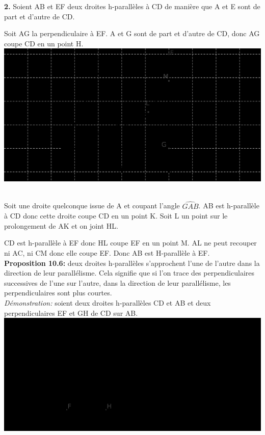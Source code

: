 \documentclass[a4paper, 12pt, twoside]{book}
\begin{document}
   \textbf{2.} Soient AB et EF deux droites h-parallèles à CD de manière que A et E sont de part et d'autre de CD.\
  
  Soit AG la perpendiculaire à EF.  A et G sont de part et d'autre de CD, donc AG coupe CD en un point H.\\
 
   \includegraphics[scale=0.5]{figures/Lobat51.eps}\ \

   
  Soit une droite quelconque issue de A et coupant l'angle $\hat{GAB}$. AB est h-parallèle à CD donc cette droite coupe CD en un point K. Soit L un point sur le prolongement de AK et on joint HL.\
  
  CD est h-parallèle à EF donc HL coupe EF en un point M. AL ne peut recouper ni AC, ni CM donc elle coupe EF. Donc AB est H-parallèle à EF.\\
  
   
   \textbf{Proposition 10.6:} deux droites h-parallèles s'approchent l'une de l'autre dans la direction de leur parallélisme. Cela signifie que si l'on trace des perpendiculaires successives de l'une sur l'autre, dans la direction de leur parallélisme, les perpendiculaires sont plus courtes.\\
   
   \textit{Démonstration:} soient deux droites h-parallèles CD et AB et deux perpendiculaires EF et GH de CD sur AB.\\
   
  \includegraphics[scale=0.2]{figures/Lobat9.eps}\ 
  
\end{document}
